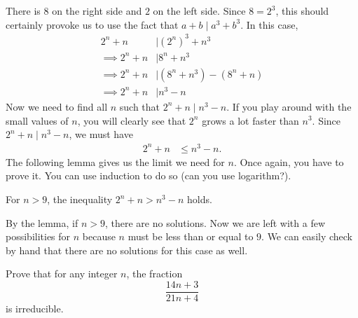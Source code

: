 	\begin{solution}
		There is $8$ on the right side and $2$ on the left side. Since $8=2^3$, this should certainly provoke us to use the fact that $a+b\mid a^3+b^3$. In this case,
			\begin{align*}
				2^n+n   & \mid (2^n)^3+n^3 \\
				\implies  2^n+n & \mid 8^n+n^3\\
				\implies 2^n+n	& \mid (8^n+n^3)-(8^n+n)\\
				\implies 2^n+n & \mid n^3-n
			\end{align*}
		Now we need to find all $n$ such that $2^n+n\mid n^3-n$. If you play around with the small values of $n$, you will clearly see that $2^n$ grows a lot faster than $n^3$. Since $2^n+n\mid n^3-n$, we must have
			\begin{align*}
				2^n+n & \leq n^3-n.
			\end{align*}
		The following lemma gives us the limit we need for $n$. Once again, you have to prove it. You can use induction to do so (can you use logarithm?).
			\begin{lemma}
				For $n>9$, the inequality $2^n+n>n^3-n$ holds.
			\end{lemma}
		By the lemma, if $n>9$, there are no solutions. Now we are left with a few possibilities for $n$ because $n$ must be less than or equal to $9$. We can easily check by hand that there are no solutions for this case as well.
	\end{solution}

	\begin{problem}
		Prove that for any integer $n$, the fraction $$\dfrac{14n+3}{21n+4}$$ is irreducible.
	\end{problem}

